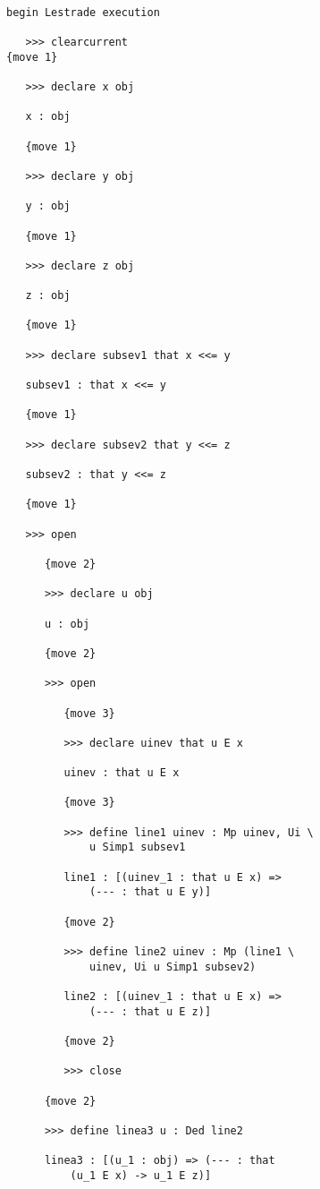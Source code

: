 \documentclass[12pt]{article}
\begin{document}
\begin{verbatim}

begin Lestrade execution

   >>> clearcurrent
{move 1}

   >>> declare x obj

   x : obj

   {move 1}

   >>> declare y obj

   y : obj

   {move 1}

   >>> declare z obj

   z : obj

   {move 1}

   >>> declare subsev1 that x <<= y

   subsev1 : that x <<= y

   {move 1}

   >>> declare subsev2 that y <<= z

   subsev2 : that y <<= z

   {move 1}

   >>> open

      {move 2}

      >>> declare u obj

      u : obj

      {move 2}

      >>> open

         {move 3}

         >>> declare uinev that u E x

         uinev : that u E x

         {move 3}

         >>> define line1 uinev : Mp uinev, Ui \
             u Simp1 subsev1

         line1 : [(uinev_1 : that u E x) => 
             (--- : that u E y)]

         {move 2}

         >>> define line2 uinev : Mp (line1 \
             uinev, Ui u Simp1 subsev2)

         line2 : [(uinev_1 : that u E x) => 
             (--- : that u E z)]

         {move 2}

         >>> close

      {move 2}

      >>> define linea3 u : Ded line2

      linea3 : [(u_1 : obj) => (--- : that 
          (u_1 E x) -> u_1 E z)]


\end{verbatim}
\end{document}
